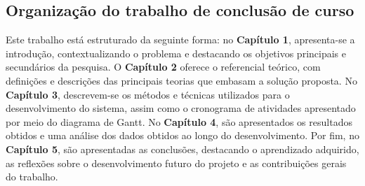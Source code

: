 \subsection{Organização do trabalho de conclusão de curso}

Este trabalho está estruturado da seguinte forma: no \textbf{Capítulo 1}, apresenta-se a introdução, contextualizando o problema e destacando os objetivos principais e secundários da pesquisa. O \textbf{Capítulo 2} oferece o referencial teórico, com definições e descrições das principais teorias que embasam a solução proposta. No \textbf{Capítulo 3}, descrevem-se os métodos e técnicas utilizados para o desenvolvimento do sistema, assim como o cronograma de atividades apresentado por meio do diagrama de Gantt. No \textbf{Capítulo 4}, são apresentados os resultados obtidos e uma análise dos dados obtidos ao longo do desenvolvimento. Por fim, no \textbf{Capítulo 5}, são apresentadas as conclusões, destacando o aprendizado adquirido, as reflexões sobre o desenvolvimento futuro do projeto e as contribuições gerais do trabalho.

